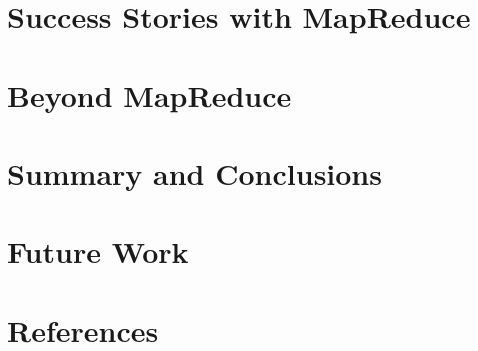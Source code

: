 \documentclass[xcolor=dvipsnames,dvip,notes=show,table]{beamer}
\begin{document}
\section{Success Stories with MapReduce}



\section{Beyond MapReduce}






\section{Summary and Conclusions}

\frame{
\titlepage

}



\section{Future Work}

\frame{
\titlepage

}



\nocite{*}

\appendix
\section*{References}


% 
% 
% 
\end{document}
